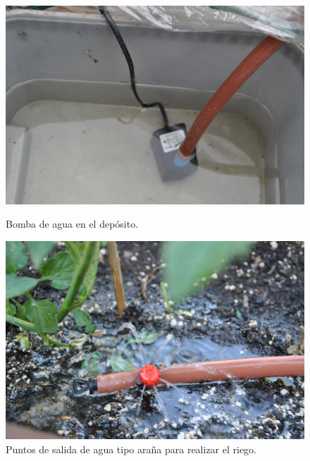 \documentclass[a4paper, 12pt, oneside]{book}
\begin{document}
\begin{figure}[H]
  \centering
  \begin{minipage}[b]{0.4\textwidth}
    \includegraphics[width=\textwidth]{img/bomba_agua}
    \caption{Bomba de agua en el depósito.}
    \label{figura:bomba_agua}
  \end{minipage}
  \hfill
  \begin{minipage}[b]{0.4\textwidth}
    \includegraphics[width=\textwidth]{img/salidas_agua}
    \caption{Puntos de salida de agua tipo araña para realizar el riego.}
    \label{figura:salidas_agua}
  \end{minipage}
\end{figure}
    
\end{document}
